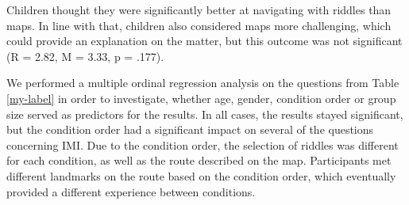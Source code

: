 Children thought they were significantly better at navigating with riddles than maps. In line with that, children also considered maps more challenging, which could provide an explanation on the matter, but this outcome was not significant (R = 2.82, M = 3.33, p = .177).
 
We performed a multiple ordinal regression analysis on the questions from Table \ref{my-label} in order to investigate, whether age, gender, condition order or group size served as predictors for the results. In all cases, the results stayed significant, but the condition order had a significant impact on several of the questions concerning IMI. Due to the condition order, the selection of riddles was different for each condition, as well as the route described on the map. Participants met different landmarks on the route based on the condition order, which eventually provided a different experience between conditions. 

